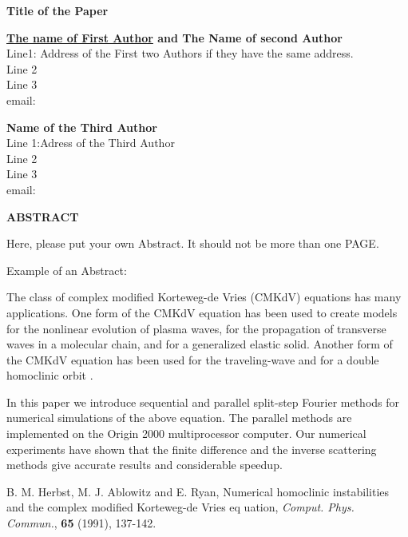 \renewcommand\floatpagefraction{0.9}
\renewcommand{\baselinestretch}{1.}
\topmargin 0.3in
\newcommand{\marg}[1]{\marginpar{\raggedright\scriptsize#1}}
\parskip=10pt
\setlength{\textwidth}{6.5in}
\setlength{\textheight}{8.5in}
\setlength{\evensidemargin}{0.0in}
\setlength{\oddsidemargin}{0.0in}

\pagestyle{empty}
\begin{center}
\begin{large}
{\bf Title of the Paper}
\end{large}
\end{center}

\vskip0.4in
\begin{center}
{\large \bf\underline{The name of First Author} and The Name of second Author}\\
Line1: Address of the First two Authors if they have the same address.\\
Line 2\\
Line 3\\
email: \\
\end{center}

\begin{center}
{\large \bf Name of the Third Author}\\
Line 1:Adress of the Third Author\\
Line 2\\
Line 3\\
email: 
\end{center}

\bigskip
\centerline {{\bf ABSTRACT}}
\bigskip

Here, please put your own Abstract. It should not be more than one PAGE.

Example of an Abstract: 

The class of complex modified Korteweg-de Vries (CMKdV) equations has many
applications. One form of the CMKdV equation has been used to create models 
for the nonlinear evolution of plasma waves, for the propagation of transverse 
waves in a molecular chain, and for a generalized elastic solid.
Another form of the CMKdV equation has been used for the traveling-wave and
for a double homoclinic orbit \cite{Herbst_Ablowitz_Ryan}.

In this paper we introduce sequential and parallel split-step Fourier methods
for numerical simulations of the above equation.
The parallel methods are implemented on the Origin 2000 multiprocessor computer.
Our numerical experiments have shown that the finite difference and the
inverse scattering methods give accurate results and considerable speedup.



\begin{thebibliography}{1}

 B. M. Herbst, M. J. Ablowitz and E. Ryan,
Numerical homoclinic instabilities and the complex modified Korteweg-de Vries eq
uation,
{\sl Comput. Phys. Commun.}, {\bf 65} (1991),
137-142.


\end{thebibliography}


